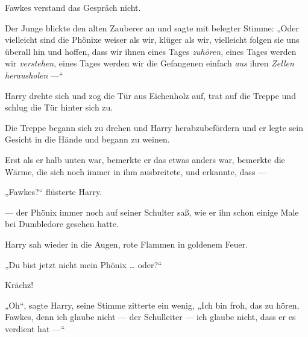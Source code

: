 Fawkes verstand das Gespräch nicht.

Der Junge blickte den alten Zauberer an und sagte mit belegter Stimme:
„Oder vielleicht sind die Phönixe weiser als wir, klüger als wir, vielleicht folgen sie uns überall hin und hoffen, dass wir ihnen eines Tages \emph{zuhören}, eines Tages werden wir \emph{verstehen}, eines Tages werden wir die Gefangenen einfach \emph{aus} ihren \emph{Zellen} \emph{herausholen} —“

Harry drehte sich und zog die Tür aus Eichenholz auf, trat auf die Treppe und schlug die Tür hinter sich zu.

Die Treppe begann sich zu drehen und Harry herabzubefördern und er legte sein Gesicht in die Hände und begann zu weinen.

Erst als er halb unten war, bemerkte er das etwas anders war, bemerkte die Wärme, die sich noch immer in ihm ausbreitete, und erkannte, dass —

„Fawkes?“ flüsterte Harry.

— der Phönix immer noch auf seiner Schulter saß, wie er ihn schon einige Male bei Dumbledore gesehen hatte.

Harry sah wieder in die Augen, rote Flammen in goldenem Feuer.

„Du bist jetzt nicht mein Phönix … oder?“

Krächz!

„Oh“, sagte Harry, seine Stimme zitterte ein wenig,
„Ich bin froh, das zu hören, Fawkes, denn ich glaube nicht — der Schulleiter — ich glaube nicht, dass er es verdient hat —“

